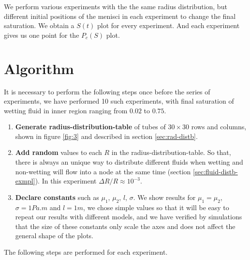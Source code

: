\documentclass[
	12pt
] {article}
\begin{document}
	We perform various experiments with the the same radius distribution, but different initial positions of the menisci in each experiment to change the final saturation. We obtain a $S(t)$ plot for every experiment. And each experiment gives us one point for the $P_c(S)$ plot. 

	
\section{Algorithm}
It is necessary to perform the following steps once before the series of experiments, we have performed 10 such experiments, with final saturation of wetting fluid in inner region ranging from $0.02$ to $0.75$.

\begin{enumerate}
	\item \textbf{Generate radius-distribution-table} of tubes of $30 \times 30$ rows and columns, shown in figure \ref{fig:3} and described in section \ref{sec:rad-distb}.
	
	\item \textbf{Add random} values to each $R$ in the radius-distribution-table. So that, there is always an unique way to distribute different fluids when wetting and non-wetting will flow into a node at the same time (section \ref{sec:fluid-distb-exmpl}). In this experiment $\Delta R/R \approx 10^{-3}$.
	
	\item \textbf{Declare constants} such as ${\mu}_{1}$, ${\mu}_{2}$, $l$, $\sigma$. We show results for ${\mu}_1 = {\mu}_2$, $\sigma = 1 Pa.m$ and $l = 1 m$, we chose simple values so that it will be easy to repeat our results with different models, and we have verified by simulations that the size of these constants only scale the axes and does not affect the general shape of the plots.
\end{enumerate}

The following steps are performed for each experiment.
\end{document}
